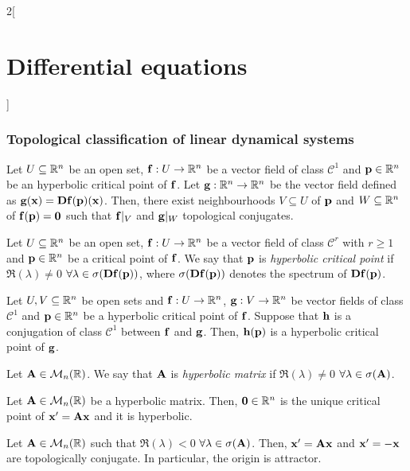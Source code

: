 \documentclass[../../../main.tex]{subfiles}
\begin{document}
\begin{multicols}{2}[\section{Differential equations}]
    \subsubsection{Topological classification of linear dynamical systems}
    \begin{theorem}
        Let $U\subseteq \mathbb{R}^n$ be an open set, $\boldsymbol{\mathrm{f}}:U\rightarrow\mathbb{R}^n$ be a vector field of class $\mathcal{C}^1$ and $\boldsymbol{\mathrm{p}}\in\mathbb{R}^n$ be an hyperbolic critical point of $\boldsymbol{\mathrm{f}}$. Let $\boldsymbol{\mathrm{g}}:\mathbb{R}^n\rightarrow\mathbb{R}^n$ be the vector field defined as $\boldsymbol{\mathrm{g}}(\boldsymbol{\mathrm{x}})=\boldsymbol{\mathrm{Df}}(\boldsymbol{\mathrm{p}})(\boldsymbol{\mathrm{x}})$. Then, there exist neighbourhoods $V\subseteq U$ of $\boldsymbol{\mathrm{p}}$ and $W\subseteq \mathbb{R}^n$ of $\boldsymbol{\mathrm{f}}(\boldsymbol{\mathrm{p}})=\boldsymbol{\mathrm{0}}$ such that $\boldsymbol{\mathrm{f}}|_V$ and $\boldsymbol{\mathrm{g}}|_W$ topological conjugates.
    \end{theorem}
    \begin{definition}
        Let $U\subseteq \mathbb{R}^n$ be an open set, $\boldsymbol{\mathrm{f}}:U\rightarrow\mathbb{R}^n$ be a vector field of class $\mathcal{C}^r$ with $r\geq 1$ and $\boldsymbol{\mathrm{p}}\in\mathbb{R}^n$ be a critical point of $\boldsymbol{\mathrm{f}}$. We say that $\boldsymbol{\mathrm{p}}$ is \emph{hyperbolic critical point} if $\Re(\lambda)\ne 0$ $\forall \lambda\in\sigma(\boldsymbol{\mathrm{Df}}(\boldsymbol{\mathrm{p}}))$, where $\sigma(\boldsymbol{\mathrm{Df}}(\boldsymbol{\mathrm{p}}))$ denotes the spectrum of $\boldsymbol{\mathrm{Df}}(\boldsymbol{\mathrm{p}})$.
    \end{definition}
    \begin{corollary}
        Let $U,V\subseteq \mathbb{R}^n$ be open sets and $\boldsymbol{\mathrm{f}}:U\rightarrow\mathbb{R}^n$, $\boldsymbol{\mathrm{g}}:V\rightarrow\mathbb{R}^n$ be vector fields of class $\mathcal{C}^1$ and $\boldsymbol{\mathrm{p}}\in\mathbb{R}^n$ be a hyperbolic critical point of $\boldsymbol{\mathrm{f}}$. Suppose that $\boldsymbol{\mathrm{h}}$ is a conjugation of class $\mathcal{C}^1$ between $\boldsymbol{\mathrm{f}}$ and $\boldsymbol{\mathrm{g}}$. Then, $\boldsymbol{\mathrm{h}}(\boldsymbol{\mathrm{p}})$ is a hyperbolic critical point of $\boldsymbol{\mathrm{g}}$.
    \end{corollary}
    \begin{definition}
        Let $\boldsymbol{\mathrm{A}}\in\mathcal{M}_n(\mathbb{R})$. We say that $\boldsymbol{\mathrm{A}}$ is \emph{hyperbolic matrix} if $\Re(\lambda)\ne 0$ $\forall\lambda\in\sigma(\boldsymbol{\mathrm{A}})$.
    \end{definition}
    \begin{prop}
        Let $\boldsymbol{\mathrm{A}}\in\mathcal{M}_n(\mathbb{R})$ be a hyperbolic matrix. Then, $\boldsymbol{\mathrm{0}}\in\mathbb{R}^n$ is the unique critical point of $\boldsymbol{\mathrm{x}}'=\boldsymbol{\mathrm{A}}\boldsymbol{\mathrm{x}}$ and it is hyperbolic.
    \end{prop}
    \begin{theorem}
        Let $\boldsymbol{\mathrm{A}}\in\mathcal{M}_n(\mathbb{R})$ such that $\Re(\lambda)<0$ $\forall\lambda\in\sigma(\boldsymbol{\mathrm{A}})$. Then, $\boldsymbol{\mathrm{x}}'=\boldsymbol{\mathrm{A}}\boldsymbol{\mathrm{x}}$ and $\boldsymbol{\mathrm{x}}'=-\boldsymbol{\mathrm{x}}$ are topologically conjugate. In particular, the origin is attractor.

\end{theorem}
\end{multicols}
\end{document}
